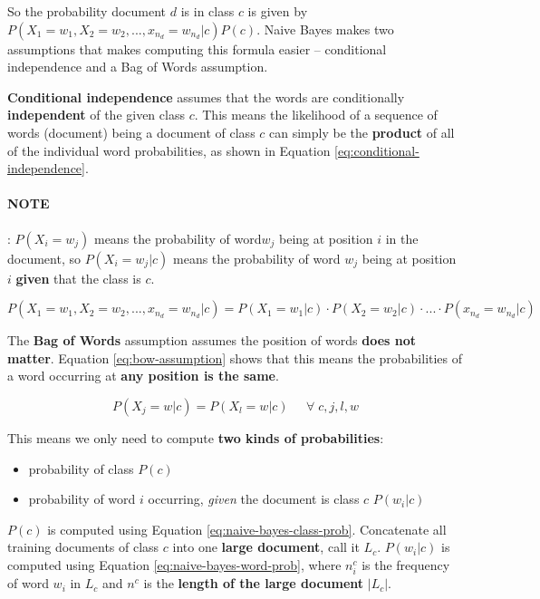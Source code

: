 \documentclass{article}
\begin{document}
So the probability document $d$ is in class $c$ is given by $P(X_1 = w_1, X_2 = w_2, ..., x_{n_d} = w_{n_d} | c)P(c)$. Naive Bayes makes two assumptions that makes computing this formula easier -- conditional independence and a Bag of Words assumption.

\textbf{Conditional independence} assumes that the words are conditionally \textbf{independent} of the given class $c$.  This means the likelihood of a sequence of words (document) being a document of class $c$ can simply be the \textbf{product} of all of the individual word probabilities, as shown in Equation \ref{eq:conditional-independence}.

\paragraph{\textbf{NOTE}}: $P(X_i = w_j)$ means the probability of word$w_j$ being at position $i$ in the document, so $P(X_i = w_j|c)$ means the probability of word $w_j$ being at position $i$ \textbf{given} that the class is $c$.

\begin{equation}
	P(X_1 = w_1, X_2 = w_2, ..., x_{n_d} = w_{n_d} | c) = P(X_1 = w_1|c) \cdot P(X_2 = w_2 | c) \cdot ... \cdot P(x_{n_d} = w_{n_d}|c)
	\label{eq:conditional-independence}
\end{equation}

The \textbf{Bag of Words} assumption assumes the position of words \textbf{does not matter}. Equation \ref{eq:bow-assumption} shows that this means the probabilities of a word occurring at \textbf{any position is the same}.

\begin{equation}
	P(X_j = w | c) = P(X_l = w| c)  \;\;\;\;\;
	\forall \; c,j,l,w
	\label{eq:bow-assumption}
\end{equation}

This means we only need to compute \textbf{two kinds of probabilities}:
\begin{itemize}
	\item probability of class $P(c)$
	\item probability of word $i$ occurring, \textit{given} the document is class $c$ $P(w_i|c)$
\end{itemize}
$P(c)$ is computed using Equation \ref{eq:naive-bayes-class-prob}. Concatenate all training documents of class $c$ into one \textbf{large document}, call it $L_c$. $P(w_i|c)$ is computed using Equation \ref{eq:naive-bayes-word-prob}, where $n_i^c$ is the frequency of word $w_i$ in $L_c$ and $n^c$ is the \textbf{length of the large document} $|L_c|$.
\end{document}
